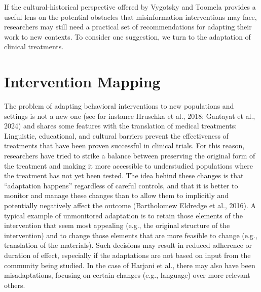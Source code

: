 \documentclass[authordate, reflection]{jote-new-article}
\begin{document}
	If the cultural-historical perspective offered by Vygotsky and Toomela provides a useful lens on the potential obstacles that misinformation interventions may face, researchers may still need a practical set of recommendations for adapting their work to new contexts. To consider one suggestion, we turn to the adaptation of clinical treatments.



	\section{Intervention Mapping}



	The problem of adapting behavioral interventions to new populations and settings is not a new one (see for instance Hruschka et al., 2018; Gantayat et al., 2024) and shares some features with the translation of medical treatments: Linguistic, educational, and cultural barriers prevent the effectiveness of treatments that have been proven successful in clinical trials. For this reason, researchers have tried to strike a balance between preserving the original form of the treatment and making it more accessible to understudied populations where the treatment has not yet been tested. The idea behind these changes is that “adaptation happens” regardless of careful controls, and that it is better to monitor and manage these changes than to allow them to implicitly and potentially negatively affect the outcome (Bartholomew Eldredge et al., 2016). A typical example of unmonitored adaptation is to retain those elements of the intervention that seem most appealing (e.g., the original structure of the intervention) and to change those elements that are more feasible to change (e.g., translation of the materials). Such decisions may result in reduced adherence or duration of effect, especially if the adaptations are not based on input from the community being studied. In the case of Harjani et al., there may also have been misadaptations, focusing on certain changes (e.g., language) over more relevant others.
\end{document}
